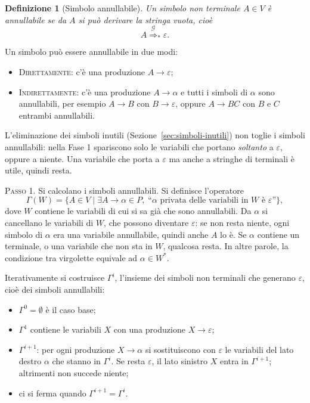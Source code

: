 \documentclass[a4paper, 11pt, oneside]{book}
\theoremstyle{formale}
\newtheorem*{definition}{Definizione}
\begin{document}
    \begin{definition}[Simbolo annullabile]
        Un simbolo non terminale $A \in V$ \`e \emph{annullabile} se da $A$ si pu\`o
        derivare la stringa vuota, cio\`e
        \begin{equation*}
            A \overset{\mathcal{G}}{\Rightarrow}_* \varepsilon.
        \end{equation*}
    \end{definition}
    Un simbolo pu\`o essere annullabile in due modi:
    \begin{itemize}
        \item \textsc{Direttamente}: c'\`e una produzione $A \to \varepsilon$;
        \item \textsc{Indirettamente}: c'\`e una produzione $A \to \alpha$ e tutti i
            simboli di $\alpha$ sono annullabili, per esempio $A \to B$ con
            $B \to \varepsilon$, oppure $A \to BC$ con $B$ e $C$ entrambi annullabili.
    \end{itemize}

    L'eliminazione dei simboli inutili (Sezione~\ref{sec:simboli-inutili}) non toglie i
    simboli annullabili: nella Fase 1 spariscono solo le variabili che portano
    \emph{soltanto} a $\varepsilon$, oppure a niente. Una variabile che porta a
    $\varepsilon$ ma anche a stringhe di terminali \`e utile, quindi resta.

    \textsc{Passo 1}. Si calcolano i simboli annullabili. Si definisce l'operatore
    \begin{equation*}
        \Gamma(W) = \{A \in V \mid \exists A \to \alpha \in P,\;
        \text{``$\alpha$ privata delle variabili in $W$ \`e $\varepsilon$''}\},
    \end{equation*}
    dove $W$ contiene le variabili di cui si sa gi\`a che sono annullabili. Da $\alpha$
    si cancellano le variabili di $W$, che possono diventare $\varepsilon$: se non resta
    niente, ogni simbolo di $\alpha$ era una variabile annullabile, quindi anche $A$ lo
    \`e. Se $\alpha$ contiene un terminale, o una variabile che non sta in $W$, qualcosa
    resta. In altre parole, la condizione tra virgolette equivale ad
    $\alpha \in W^*$.

    Iterativamente si costruisce $\Gamma^i$, l'insieme dei simboli non terminali che
    generano $\varepsilon$, cio\`e dei simboli annullabili:
    \begin{itemize}
        \item $\Gamma^0 = \emptyset$ \`e il caso base;
        \item $\Gamma^1$ contiene le variabili $X$ con una produzione $X \to \varepsilon$;
        \item $\Gamma^{i+1}$: per ogni produzione $X \to \alpha$ si sostituiscono con
            $\varepsilon$ le variabili del lato destro $\alpha$ che stanno in
            $\Gamma^i$. Se resta $\varepsilon$, il lato sinistro $X$ entra in
            $\Gamma^{i+1}$; altrimenti non succede niente;
        \item ci si ferma quando $\Gamma^{i+1} = \Gamma^i$.
    \end{itemize}
\end{document}
